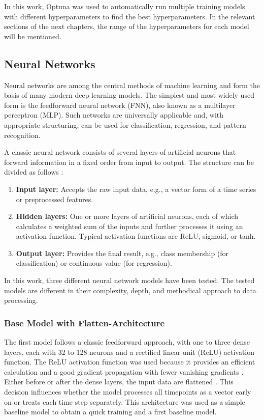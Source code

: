 In this work, Optuna was used to automatically run multiple training models with different hyperparameters to find the best hyperparameters.
In the relevant sections of the next chapters, the range of the hyperparameters for each model will be mentioned.

\subsection{Neural Networks}
\label{chap:nn}

Neural networks are among the central methods of machine learning and form the basis of many modern deep learning models.
The simplest and most widely used form is the feedforward neural network (FNN), also known as a multilayer perceptron (MLP).
Such networks are universally applicable and, with appropriate structuring, can be used for classification, regression, and pattern recognition.

A classic neural network consists of several layers of artificial neurons that forward information in a fixed order from input to output.
The structure can be divided as follows \cite{nn-basics}:

\begin{enumerate}
    \item \textbf{Input layer:} Accepts the raw input data, e.g., a vector form of a time series or preprocessed features.
    \item \textbf{Hidden layers:} One or more layers of artificial neurons, each of which calculates a weighted sum of the inputs and further processes it using an activation function.
    Typical activation functions are ReLU, sigmoid, or tanh.
    \item \textbf{Output layer:} Provides the final result, e.g., class membership (for classification) or continuous value (for regression).
\end{enumerate}

\noindent
In this work, three different neural network models have been tested.
The tested models are different in their complexity, depth, and methodical approach to data processing.

\subsubsection{Base Model with Flatten-Architecture}

The first model follows a classic feedforward approach, with one to three dense layers, each with 32 to 128 neurons and a rectified linear unit (ReLU) activation function.
The ReLU activation function was used because it provides an efficient calculation and a good gradient propagation with fewer vanishing gradients \cite{springer-ml-basics}.
Either before or after the dense layers, the input data are flattened \cite{keras-flatten}.
This decision influences whether the model processes all timepoints as a vector early on or treats each time step separately.
This architecture was used as a simple baseline model to obtain a quick training and a first baseline model.

